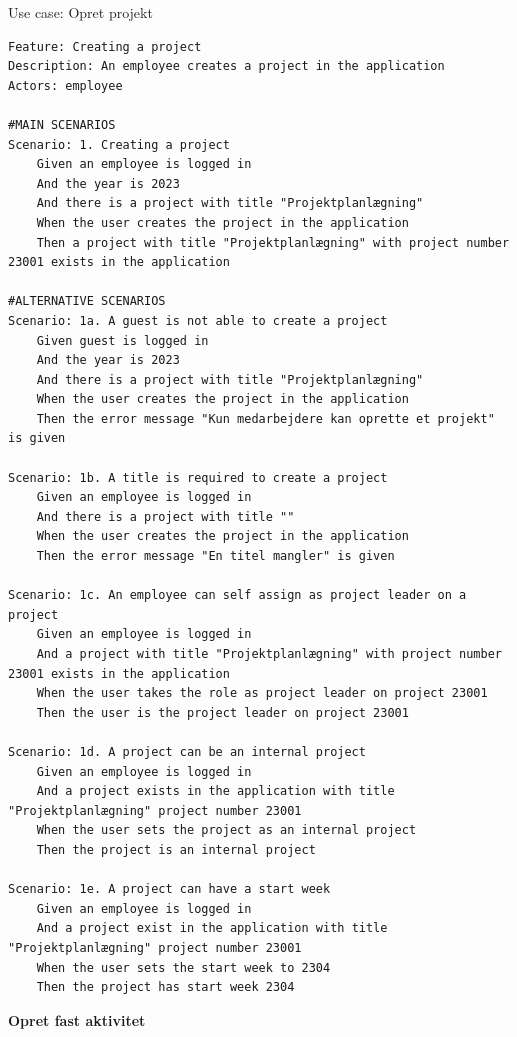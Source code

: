 \begin{listing}[H]
    \centering
    \caption{Use case: Opret projekt}\label{lst:usecase_create_project}
    \begin{verbatim}  
Feature: Creating a project
Description: An employee creates a project in the application
Actors: employee

#MAIN SCENARIOS
Scenario: 1. Creating a project
    Given an employee is logged in
    And the year is 2023
    And there is a project with title "Projektplanlægning" 
    When the user creates the project in the application 
    Then a project with title "Projektplanlægning" with project number 23001 exists in the application

#ALTERNATIVE SCENARIOS
Scenario: 1a. A guest is not able to create a project
    Given guest is logged in
    And the year is 2023
    And there is a project with title "Projektplanlægning"  
    When the user creates the project in the application 
    Then the error message "Kun medarbejdere kan oprette et projekt" is given

Scenario: 1b. A title is required to create a project
    Given an employee is logged in
    And there is a project with title ""  
    When the user creates the project in the application 
    Then the error message "En titel mangler" is given

Scenario: 1c. An employee can self assign as project leader on a project
    Given an employee is logged in
    And a project with title "Projektplanlægning" with project number 23001 exists in the application
    When the user takes the role as project leader on project 23001
    Then the user is the project leader on project 23001

Scenario: 1d. A project can be an internal project
    Given an employee is logged in
    And a project exists in the application with title "Projektplanlægning" project number 23001
    When the user sets the project as an internal project
    Then the project is an internal project

Scenario: 1e. A project can have a start week
    Given an employee is logged in
    And a project exist in the application with title "Projektplanlægning" project number 23001
    When the user sets the start week to 2304
    Then the project has start week 2304
    \end{verbatim}
\end{listing}
\textbf{Opret fast aktivitet}
